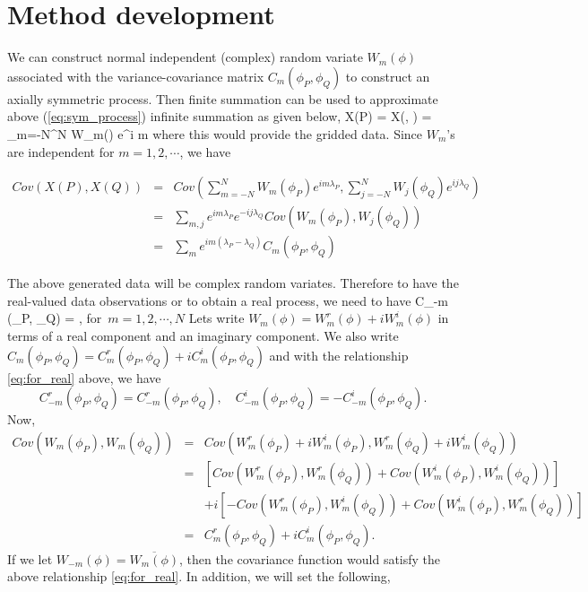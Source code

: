 	\section{Method development}
	
	
	We can construct normal independent (complex) random variate $W_m(\phi)$ associated with the variance-covariance matrix $C_m(\phi_P, \phi_Q)$ to construct an axially symmetric process. Then finite summation can be used to approximate above (\ref{eq:sym_process}) infinite summation as given below,
	\beq
	X(P) = X(\phi, \lambda) = \sum_{m=-N}^{N} W_m(\phi) e^{i m \lambda}
	\eeq
	where this would provide  the gridded data.
	Since $W_m$'s are independent for $m = 1, 2, \cdots$, we have
	
	\begin{eqnarray*}
		Cov(X(P), {X(Q)}) &=& Cov\left(\sum_{m = -N}^{N} W_m(\phi_P) e^{i m \lambda_P}, \sum_{j=-N}^{N} {W_j(\phi_Q)} e^{i j \lambda_Q}\right) \\
		&=& \sum_{m, j} e^{i m \lambda_P} e^{-i j \lambda_Q} Cov(W_m(\phi_P), {W_j(\phi_Q)}) \\
		&=& \sum_{m} e^{im (\lambda_P - \lambda_Q)} C_m(\phi_P, \phi_Q)
	\end{eqnarray*}
	
	The above generated data will be complex random variates. Therefore to have the real-valued data observations or to obtain a real process, we need to have
	\beq \label{eq:for_real}
	C_{-m} (\phi_P, \phi_Q) = , \quad \mbox{for $m = 1, 2, \cdots, N$}
	\eeq
	Lets write $W_m(\phi) = W_{m}^{r}(\phi) + i W_{m}^i(\phi)$ in terms of a real component and an imaginary component. We also write $C_m(\phi_P, \phi_Q) = C_m^r(\phi_P, \phi_Q) + i C_m^i(\phi_P, \phi_Q)$
	and with the relationship \ref{eq:for_real} above, we have
	\[
		C_{-m}^r(\phi_P, \phi_Q) = C_{-m}^r(\phi_P, \phi_Q), \quad C_{-m}^i(\phi_P, \phi_Q) = - C_{-m}^i(\phi_P, \phi_Q).
	\]
	Now,
	\begin{eqnarray*}
		Cov(W_m(\phi_P), {W_m(\phi_Q)}) &=& Cov(W_m^r(\phi_P) + iW_m^i(\phi_P), W_m^r(\phi_Q) + i W_m^i(\phi_Q)) \\
		&=& \left[Cov(W_m^r(\phi_P), W_m^r(\phi_Q)) + Cov(W_m^i(\phi_P), W_m^i(\phi_Q))\right] \\
		& & + i\left[- Cov(W_m^r(\phi_P), W_m^i(\phi_Q)) + Cov(W_m^i(\phi_P), W_m^r(\phi_Q))\right] \\
		&=& C_m^r(\phi_P, \phi_Q) + i C_m^i(\phi_P, \phi_Q).
	\end{eqnarray*}
	If we let $W_{-m}(\phi) = \overline{W_m(\phi)}$, then the covariance function would satisfy the above relationship \ref{eq:for_real}. In addition, we will set the following,
	
